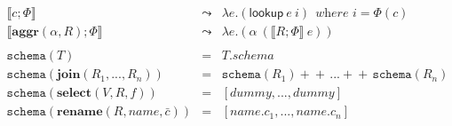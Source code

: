 \documentclass{article}
\newcommand{\concat}{\ensuremath{\!+\!\!\!\!+\!\,}}
\begin{document}
\[\begin{array}{rcl}
\llbracket \mathit{c};\Phi \rrbracket & \leadsto & \lambda e. (\mathsf{lookup}~e~i)~~\textit{where $i=\Phi(c)$}\\
\llbracket \mathbf{aggr}(\alpha, R);\Phi \rrbracket & \leadsto & \lambda e.(\alpha~(\llbracket R;\Phi\rrbracket~e))\\
\\
\mathtt{schema}(T) & = & T.\mathit{schema}\\
\mathtt{schema}(\mathbf{join}(R_1,...,R_n)) & = & \mathtt{schema}( R_1) \concat ...\concat \mathtt{schema}(R_n)\\
\mathtt{schema}(\mathbf{select}(V, R, f))&=& [\textit{dummy},...,\textit{dummy}]\\
\mathtt{schema}(\mathbf{rename}(R, \textit{name}, \bar{c})) &=& [\textit{name}.c_1,...,\textit{name}.c_n]\\
\end{array}
\]
\end{document}
